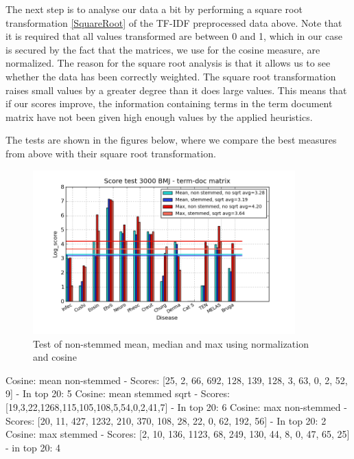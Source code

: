 The next step is to analyse our data a bit by performing a square root transformation \ref{SquareRoot} of the TF-IDF preprocessed data above. Note that it is required that all values transformed are between 0 and 1, which in our case is secured by the fact that the matrices, we use for the cosine measure, are normalized. The reason for the square root analysis is that it allows us to see whether the data has been correctly weighted. The square root transformation raises small values by a greater degree than it does large values. This means that if our scores improve, the information containing terms in the term document matrix have not been given high enough values by the applied heuristics.

The tests are shown in the figures below, where we compare the best measures from above with their square root transformation.

\begin{figure}[h!]
        \begin{center}
          \includegraphics[width=0.9\textwidth]{barcharts/termDoc_bmj_hist_3000_ns_mea_ns_mea_sqr_s_max_s_max_sqr.png}
        \end{center}
        \caption{Test of non-stemmed mean, median and max using normalization and cosine}
        \label{termDoc_bmj_hist_3000_ns_mea_ns_mea_sqr_s_max_s_max_sqr}
\end{figure}

 
Cosine: mean non-stemmed - Scores: [25, 2, 66, 692, 128, 139, 128, 3, 63, 0, 2, 52, 9] - In top 20: 5
Cosine: mean stemmed sqrt - Scores: [19,3,22,1268,115,105,108,5,54,0,2,41,7] - In top 20: 6
Cosine: max non-stemmed - Scores: [20, 11, 427, 1232, 210, 370, 108, 28, 22, 0, 62, 192, 56] - In top 20: 2
Cosine: max stemmed - Scores: [2, 10, 136, 1123, 68, 249, 130, 44, 8, 0, 47, 65, 25] - in top 20: 4

